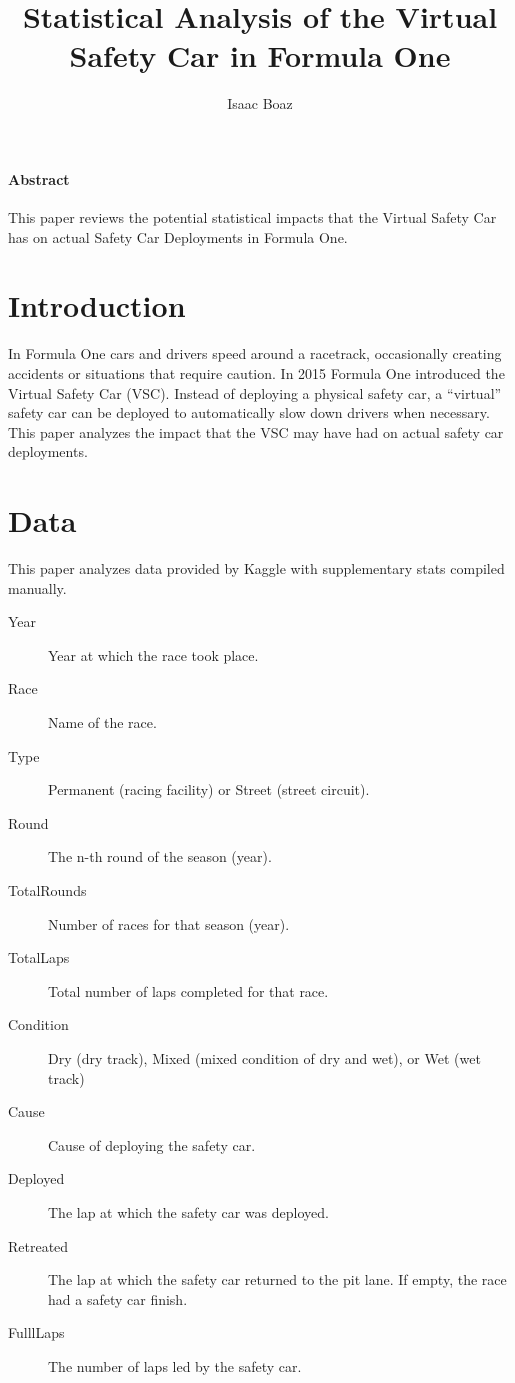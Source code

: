 \documentclass[11pt]{article}
\title{Statistical Analysis of the Virtual Safety Car in Formula One}
\author{Isaac Boaz}
\date{}
\begin{document}
\maketitle
\paragraph*{Abstract}
This paper reviews the potential statistical impacts that the Virtual Safety Car has on actual Safety Car Deployments in Formula One.

\pagebreak

\section{Introduction}
In Formula One cars and drivers speed around a racetrack, occasionally creating accidents or situations that require caution. In 2015 Formula One introduced the Virtual Safety Car (VSC). Instead of deploying a physical safety car, a ``virtual'' safety car can be deployed to automatically slow down drivers when necessary. This paper analyzes the impact that the VSC may have had on actual safety car deployments.

\section{Data}
This paper analyzes data provided by Kaggle with supplementary stats compiled manually.
\begin{description}
    \item[Year] Year at which the race took place.
    \item[Race] Name of the race.
    \item[Type] Permanent (racing facility) or Street (street circuit).
    \item[Round] The n-th round of the season (year).
    \item[TotalRounds] Number of races for that season (year).
    \item[TotalLaps] Total number of laps completed for that race.
    \item[Condition] Dry (dry track), Mixed (mixed condition of dry and wet), or Wet (wet track)
    \item[Cause] Cause of deploying the safety car.
    \item[Deployed] The lap at which the safety car was deployed.
    \item[Retreated] The lap at which the safety car returned to the pit lane. If empty, the race had a safety car finish.
    \item[FulllLaps] The number of laps led by the safety car.
\end{description}
\end{document}
